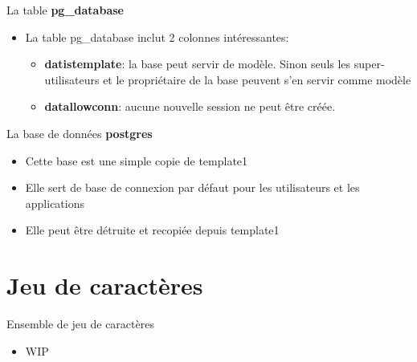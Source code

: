 
\begin{frame}{La table \textbf{pg\_database}}

\begin{itemize}
   \item La table pg\_database inclut 2 colonnes intéressantes:
   \begin{itemize}
      \item \textbf{datistemplate}: la base peut servir de modèle. Sinon seuls les super-utilisateurs et le propriétaire de la base peuvent s'en servir comme modèle
      \item \textbf{datallowconn}: aucune nouvelle session ne peut être créée.
   \end{itemize}
\end{itemize}

\end{frame}


\begin{frame}{La base de données \textbf{postgres}}

\begin{itemize}
   \item Cette base est une simple copie de template1
   \item Elle sert de base de connexion par défaut pour les utilisateurs et les applications
   \item Elle peut être détruite et recopiée depuis template1
\end{itemize}

\end{frame}


\section{Jeu de caractères}


\begin{frame}[fragile]{Ensemble de jeu de caractères}

\begin{itemize}
   \item WIP
\end{itemize}

\begin{toile}
\end{toile}

\end{frame}

